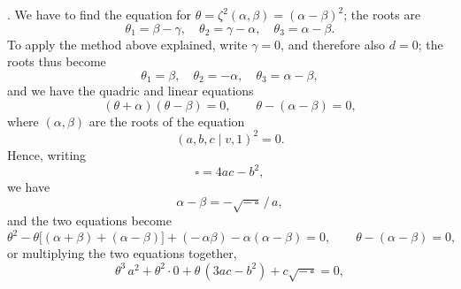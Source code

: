 \documentclass[11pt]{article}
\newcommand{\Cdel}{\mid}
\begin{document}
. We have to find the equation for $\theta = \zeta^2(\alpha, \beta) = (\alpha - \beta)^2$; the roots are
\[
   \theta_1 = \beta - \gamma,\quad \theta_2 = \gamma - \alpha,\quad \theta_3 = \alpha - \beta.
\]
To apply the method above explained, write $\gamma = 0$, and therefore also $d = 0$; the roots thus become
\[
   \theta_1 = \beta,\quad \theta_2 = -\alpha,\quad \theta_3 = \alpha - \beta,
\]
and we have the quadric and linear equations
\[
   (\theta + \alpha)(\theta - \beta) = 0,\qquad \theta - (\alpha - \beta) = 0,
\]
where $(\alpha, \beta)$ are the roots of the equation
\[
   (a, b, c \Cdel v, 1)^2 = 0.
\]
Hence, writing
\[
   \square = 4 a c - b^2,
\]
we have
\[
   \alpha - \beta = -\sqrt{-\,\square}\,/\,a,
\]
and the two equations become
\[
   \theta^2 - \theta\bigl[(\alpha + \beta) + (\alpha - \beta)\bigr] + (-\,\alpha\beta) - \alpha(\alpha - \beta) = 0,\qquad \theta - (\alpha - \beta) = 0,
\]
or multiplying the two equations together,
\[
   \theta^3\,a^2 + \theta^2\cdot 0 + \theta\,(3 a c - b^2) + c\sqrt{-\,\square} = 0,
\]
\end{document}
